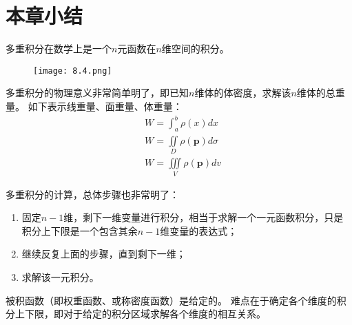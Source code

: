 \section{本章小结}

多重积分在数学上是一个$n$元函数在$n$维空间的积分。
\begin{figure}[h]
\centering
\texttt{[image: 8.4.png]}
\end{figure}

多重积分的物理意义非常简单明了，即已知$n$维体的体密度，求解该$n$维体的总重量。
如下表示线重量、面重量、体重量：
\begin{align*}
&W=\int_a^b{\rho \left( x \right) dx} \\
&W=\iint\limits_D{\rho \left( \boldsymbol{p} \right) d\sigma} \\
&W=\iiint\limits_V{\rho \left( \boldsymbol{p} \right) dv}
\end{align*}

多重积分的计算，总体步骤也非常明了：
\begin{enumerate}
    \item 固定$n-1$维，剩下一维变量进行积分，相当于求解一个一元函数积分，只是积分上下限是一个包含其余$n-1$维变量的表达式；
    \item 继续反复上面的步骤，直到剩下一维；
    \item 求解该一元积分。
\end{enumerate}
被积函数（即权重函数、或称密度函数）是给定的。
难点在于确定各个维度的积分上下限，即对于给定的积分区域求解各个维度的相互关系。




